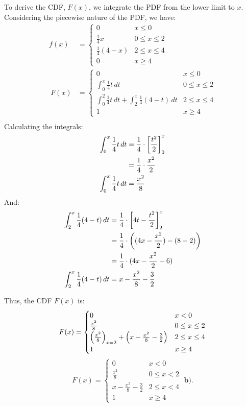 \documentclass[a4paper, 10pt]{article}
\begin{document}
\begin{solution}
To derive the CDF, \( F(x) \), we integrate the PDF from the lower limit to \( x \). \\
Considering the piecewise nature of the PDF, we have:
\begin{align*}
    f(x) &= \begin{cases}
        0 & x \le 0 \\
        \frac{1}{4}x & 0 \leq x \le 2 \\
        \frac{1}{4}(4 - x) & 2 \leq x \le 4 \\
        0 & x \geq 4
    \end{cases} \\ \
    F(x) &= \begin{cases}
        0 & x \le 0 \\
        \int_{0}^{x} \frac{1}{4}t\,dt & 0 \leq x \le 2 \\
        \int_{0}^{2} \frac{1}{4}t\,dt + \int_{2}^{x} \frac{1}{4}(4 - t)\,dt & 2 \leq x \le 4 \\
        1 & x \geq 4
    \end{cases} \\
\end{align*}
Calculating the integrals:
\begin{align*}
    \int_{0}^{x} \frac{1}{4}t\,dt &= \frac{1}{4} \cdot \left[\frac{t^2}{2}\right]_{0}^{x} \\
    &= \frac{1}{4} \cdot \frac{x^2}{2} \\
    \int_{0}^{x} \frac{1}{4}t\,dt &= \frac{x^2}{8} \\
\end{align*}
And:
\begin{align*}
    \int_{2}^{x} \frac{1}{4}(4 - t)\,dt &= \frac{1}{4} \cdot \left[4t - \frac{t^2}{2}\right]_{2}^{x} \\
    &= \frac{1}{4} \cdot \left((4x - \frac{x^2}{2}) - (8 - 2)\right) \\
    &= \frac{1}{4} \cdot (4x - \frac{x^2}{2} - 6) \\
    \int_{2}^{x} \frac{1}{4}(4 - t)\,dt &= x - \frac{x^2}{8} - \frac{3}{2} \\
\end{align*}

Thus, the CDF \( F(x) \) is:
\[
F(x) = \begin{cases}
    0 & x < 0 \\
    \frac{x^2}{8} & 0 \leq x \le 2 \\
    \left(\frac{x^2}{8}\right)_{x=2} + \left(x - \frac{x^2}{8} - \frac{3}{2}\right) & 2 \leq x \le 4 \\
    1 & x \geq 4
\end{cases}
\]
\[
\boxed{F(x) = \begin{cases}
    0 & x < 0 \\
    \frac{x^2}{8} & 0 \leq x < 2 \\
    x - \frac{x^2}{8} - \frac{3}{2} & 2 \leq x < 4 \\
    1 & x \geq 4
\end{cases}} \; \textbf{b).}
\]
\end{solution}
\end{document}
